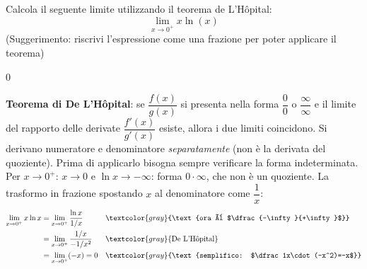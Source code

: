 
\begin{question}[ID=1.3, subtitle={De L'Hôpital: $\lim_{x\to0^+} x\ln x$}, tags={de l'hospital, limiti}, difficulty=facile]
Calcola il seguente limite utilizzando il teorema de L'Hôpital:
\[
\lim_{x \to 0^+} x \ln(x)
\]
(Suggerimento: riscrivi l'espressione come una frazione per poter applicare il teorema)
\begin{solution}
$0$
\end{solution}
\begin{explanation}
\textbf{Teorema di De L'Hôpital}: se $\dfrac{f(x)}{g(x)}$ si presenta nella forma $\dfrac00$ o $\dfrac\infty\infty$ e il limite del rapporto delle derivate $\dfrac{f'(x)}{g'(x)}$ esiste, allora i due limiti coincidono. Si derivano numeratore e denominatore \emph{separatamente} (non è la derivata del quoziente). Prima di applicarlo bisogna sempre verificare la forma indeterminata.
Per $x\to0^+$: $x\to0$ e $\ln x\to-\infty$: forma $0\cdot\infty$, che non è un quoziente. La trasformo in frazione spostando $x$ al denominatore come $\dfrac1x$:
\[\begin{aligned}
\lim_{x\to0^+}x\ln x &= \lim_{x\to0^+}\dfrac{\ln x}{1/x} && \textcolor{gray}{\text{ora è $\dfrac{-\infty}{+\infty}$}}\\
&= \lim_{x\to0^+}\dfrac{1/x}{-1/x^2} && \textcolor{gray}{\text{De L'Hôpital}}\\
&= \lim_{x\to0^+}(-x)=0 && \textcolor{gray}{\text{semplifico: $\dfrac1x\cdot(-x^2)=-x$}}
\end{aligned}\]
\end{explanation}
\end{question}



